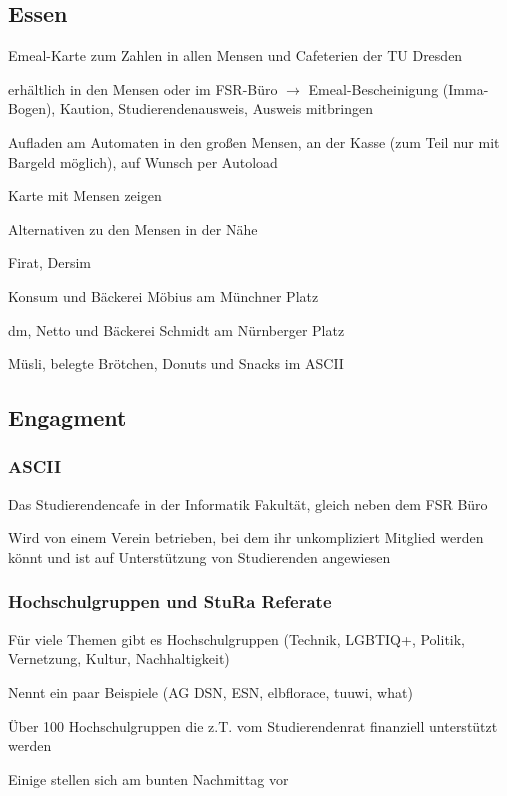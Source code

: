 \documentclass[a4paper,12pt]{scrreprt}
\begin{document}
\subsection{Essen}
\begin{itemize*}
    \item Emeal-Karte zum Zahlen in allen Mensen und Cafeterien der TU Dresden
    \item erhältlich in den Mensen oder im FSR-Büro
    $\rightarrow$ Emeal-Bescheinigung (Imma-Bogen),  Kaution, Studierendenausweis, Ausweis mitbringen
    \item Aufladen am Automaten in den großen Mensen, an der Kasse (zum Teil nur mit Bargeld möglich), auf Wunsch per Autoload
    \item Karte mit Mensen zeigen
    \item Alternativen zu den Mensen in der Nähe
    \begin{itemize*}
        \item Firat, Dersim
        \item Konsum und Bäckerei Möbius am Münchner Platz
        \item dm, Netto und Bäckerei Schmidt am Nürnberger Platz
        \item Müsli, belegte Brötchen, Donuts und Snacks im ASCII
    \end{itemize*}
\end{itemize*}

\subsection{Engagment}

\subsubsection{ASCII}
\begin{itemize*}
    \item Das Studierendencafe in der Informatik Fakultät, gleich neben dem FSR Büro
    \item Wird von einem Verein betrieben, bei dem ihr unkompliziert Mitglied werden könnt und ist auf Unterstützung von Studierenden angewiesen
\end{itemize*}

\subsubsection{Hochschulgruppen und StuRa Referate}
\begin{itemize*}
    \item Für viele Themen gibt es Hochschulgruppen (Technik, LGBTIQ+, Politik, Vernetzung, Kultur, Nachhaltigkeit)
    \item Nennt ein paar Beispiele (AG DSN, ESN, elbflorace, tuuwi, what)
    \item Über 100 Hochschulgruppen die z.T. vom Studierendenrat finanziell unterstützt werden
    \item Einige stellen sich am bunten Nachmittag vor
\end{itemize*}
\end{document}
